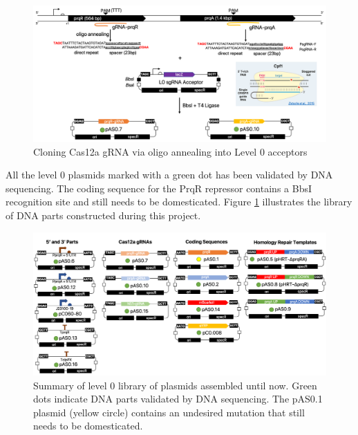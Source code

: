 \begin{figure}[H]
    \centering
    \includegraphics[width=\hsize]{figs/gRNA.png}
    \caption{Cloning Cas12a gRNA via oligo annealing into Level 0  acceptors}
\end{figure}
All the level 0 plasmids marked with a green dot has been validated by DNA sequencing. The coding sequence for the PrqR repressor contains a BbsI recognition site and still needs to be domesticated. Figure \ref{fig:L0} illustrates the library of DNA parts constructed during this project.
\begin{figure}[H]
    \centering
    \includegraphics[width=\hsize]{figs/l0.png}
    \caption{Summary of level 0 library of plasmids assembled until now. Green dots indicate DNA parts validated by DNA sequencing. The pAS0.1 plasmid (yellow circle) contains an undesired mutation that still needs to be domesticated.}
    \label{fig:L0}
\end{figure}


